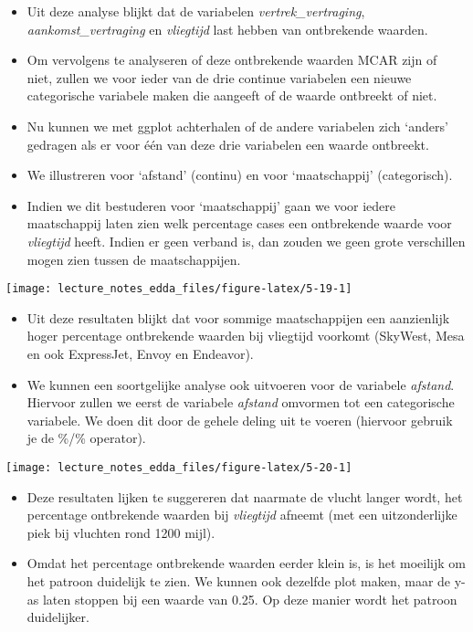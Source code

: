 \documentclass[]{memoir}
\providecommand{\tightlist}{%
  \setlength{\itemsep}{0pt}\setlength{\parskip}{0pt}}
\begin{document}
\begin{itemize}
\item
  Uit deze analyse blijkt dat de variabelen \emph{vertrek\_vertraging}, \emph{aankomst\_vertraging} en \emph{vliegtijd} last hebben van ontbrekende waarden.
\item
  Om vervolgens te analyseren of deze ontbrekende waarden MCAR zijn of niet, zullen we voor ieder van de drie continue variabelen een nieuwe categorische variabele maken die aangeeft of de waarde ontbreekt of niet.
\item
  Nu kunnen we met ggplot achterhalen of de andere variabelen zich `anders' gedragen als er voor één van deze drie variabelen een waarde ontbreekt.
\item
  We illustreren voor `afstand' (continu) en voor `maatschappij' (categorisch).
\item
  Indien we dit bestuderen voor `maatschappij' gaan we voor iedere maatschappij laten zien welk percentage cases een ontbrekende waarde voor \emph{vliegtijd} heeft. Indien er geen verband is, dan zouden we geen grote verschillen mogen zien tussen de maatschappijen.
\end{itemize}

\texttt{[image: lecture\_notes\_edda\_files/figure-latex/5-19-1]}

\begin{itemize}
\tightlist
\item
  Uit deze resultaten blijkt dat voor sommige maatschappijen een aanzienlijk hoger percentage ontbrekende waarden bij vliegtijd voorkomt (SkyWest, Mesa en ook ExpressJet, Envoy en Endeavor).
\item
  We kunnen een soortgelijke analyse ook uitvoeren voor de variabele \emph{afstand}. Hiervoor zullen we eerst de variabele \emph{afstand} omvormen tot een categorische variabele. We doen dit door de gehele deling uit te voeren (hiervoor gebruik je de \%/\% operator).
\end{itemize}

\texttt{[image: lecture\_notes\_edda\_files/figure-latex/5-20-1]}

\begin{itemize}
\tightlist
\item
  Deze resultaten lijken te suggereren dat naarmate de vlucht langer wordt, het percentage ontbrekende waarden bij \emph{vliegtijd} afneemt (met een uitzonderlijke piek bij vluchten rond 1200 mijl).
\item
  Omdat het percentage ontbrekende waarden eerder klein is, is het moeilijk om het patroon duidelijk te zien. We kunnen ook dezelfde plot maken, maar de y-as laten stoppen bij een waarde van 0.25. Op deze manier wordt het patroon duidelijker.
\end{itemize}
\end{document}
